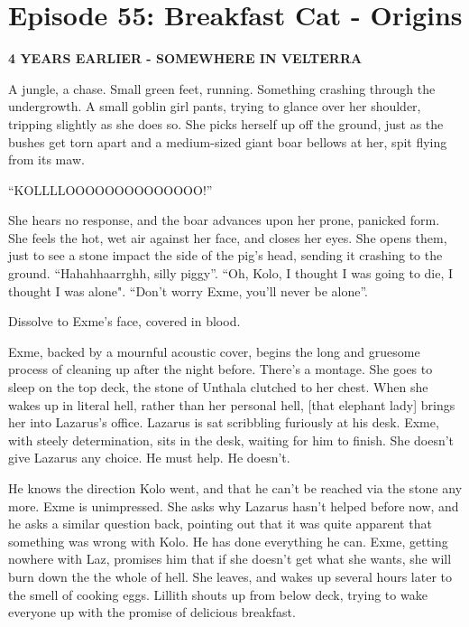 \section{Episode 55: Breakfast Cat - Origins}

\begin{multicols}{2}

\textbf{4 YEARS EARLIER - SOMEWHERE IN VELTERRA} \medskip

A jungle, a chase. Small green feet, running. Something crashing through the undergrowth. A small goblin girl pants, trying to glance over her shoulder, tripping slightly as she does so. She picks herself up off the ground, just as the bushes get torn apart and a medium-sized giant boar bellows at her, spit flying from its maw.\medskip

“KOLLLLOOOOOOOOOOOOOO!”\medskip

She hears no response, and the boar advances upon her prone, panicked form. She feels the hot, wet air against her face, and closes her eyes. She opens them, just to see a stone impact the side of the pig’s head, sending it crashing to the ground. “Hahahhaarrghh, silly piggy”. “Oh, Kolo, I thought I was going to die, I thought I was alone". “Don’t worry Exme, you’ll never be alone”. \medskip

Dissolve to Exme’s face, covered in blood.\medskip

Exme, backed by a mournful acoustic cover, begins the long and gruesome process of cleaning up after the night before. There’s a montage. She goes to sleep on the top deck, the stone of Unthala clutched to her chest. When she wakes up in literal hell, rather than her personal hell, [that elephant lady] brings her into Lazarus’s office. Lazarus is sat scribbling furiously at his desk. Exme, with steely determination, sits in the desk, waiting for him to finish. She doesn’t give Lazarus any choice. He must help. He doesn’t.\medskip

He knows the direction Kolo went, and that he can’t be reached via the stone any more. Exme is unimpressed. She asks why Lazarus hasn’t helped before now, and he asks a similar question back, pointing out that it was quite apparent that something was wrong with Kolo. He has done everything he can. Exme, getting nowhere with Laz, promises him that if she doesn't get what she wants, she will burn down the the whole of hell. She leaves, and wakes up several hours later to the smell of cooking eggs. Lillith shouts up from below deck, trying to wake everyone up with the promise of delicious breakfast.\medskip


\end{multicols}

